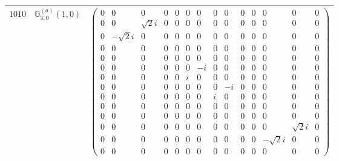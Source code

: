 \documentclass[fleqn,8pt,landscape]{jsarticle}
\begin{document}
\begin{center}
\begin{longtable}{ccc}
$ 1010 $ & $ \mathbb{G}_{3,0}^{(a)}(1,0) $ & $ \begin{pmatrix} 0 & 0 & 0 & 0 & 0 & 0 & 0 & 0 & 0 & 0 & 0 & 0 & 0 & 0 \\ 0 & 0 & \sqrt{2} i & 0 & 0 & 0 & 0 & 0 & 0 & 0 & 0 & 0 & 0 & 0 \\ 0 & - \sqrt{2} i & 0 & 0 & 0 & 0 & 0 & 0 & 0 & 0 & 0 & 0 & 0 & 0 \\ 0 & 0 & 0 & 0 & 0 & 0 & 0 & 0 & 0 & 0 & 0 & 0 & 0 & 0 \\ 0 & 0 & 0 & 0 & 0 & 0 & 0 & 0 & 0 & 0 & 0 & 0 & 0 & 0 \\ 0 & 0 & 0 & 0 & 0 & 0 & - i & 0 & 0 & 0 & 0 & 0 & 0 & 0 \\ 0 & 0 & 0 & 0 & 0 & i & 0 & 0 & 0 & 0 & 0 & 0 & 0 & 0 \\ 0 & 0 & 0 & 0 & 0 & 0 & 0 & 0 & - i & 0 & 0 & 0 & 0 & 0 \\ 0 & 0 & 0 & 0 & 0 & 0 & 0 & i & 0 & 0 & 0 & 0 & 0 & 0 \\ 0 & 0 & 0 & 0 & 0 & 0 & 0 & 0 & 0 & 0 & 0 & 0 & 0 & 0 \\ 0 & 0 & 0 & 0 & 0 & 0 & 0 & 0 & 0 & 0 & 0 & 0 & 0 & 0 \\ 0 & 0 & 0 & 0 & 0 & 0 & 0 & 0 & 0 & 0 & 0 & 0 & \sqrt{2} i & 0 \\ 0 & 0 & 0 & 0 & 0 & 0 & 0 & 0 & 0 & 0 & 0 & - \sqrt{2} i & 0 & 0 \\ 0 & 0 & 0 & 0 & 0 & 0 & 0 & 0 & 0 & 0 & 0 & 0 & 0 & 0 \end{pmatrix} $ \\ \hline

\end{longtable}
\end{center}
\end{document}
